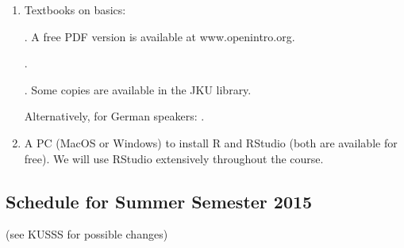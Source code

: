 \documentclass[]{article}
\begin{document}
\begin{enumerate}
\def\labelenumi{\arabic{enumi}.}
\item
  Textbooks on basics:

  . A free PDF version is available at
  www.openintro.org.

  .

  . Some copies are available in the JKU library.

  Alternatively, for German speakers: .
\item
  A PC (MacOS or Windows) to install R and RStudio (both are available
  for free). We will use RStudio extensively throughout the course.
\end{enumerate}

\subsection{Schedule for Summer Semester
2015}\label{schedule-for-summer-semester-2015}

(see KUSSS for possible changes)
\end{document}
